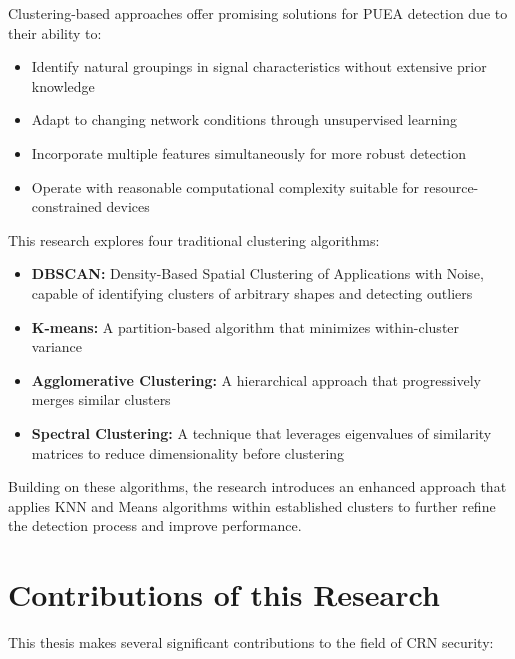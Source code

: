 Clustering-based approaches offer promising solutions for PUEA detection due to their ability to:

\begin{itemize}
    \item Identify natural groupings in signal characteristics without extensive prior knowledge
    \item Adapt to changing network conditions through unsupervised learning
    \item Incorporate multiple features simultaneously for more robust detection
    \item Operate with reasonable computational complexity suitable for resource-constrained devices
\end{itemize}

This research explores four traditional clustering algorithms:

\begin{itemize}
    \item \textbf{DBSCAN:} Density-Based Spatial Clustering of Applications with Noise, capable of identifying clusters of arbitrary shapes and detecting outliers
    \item \textbf{K-means:} A partition-based algorithm that minimizes within-cluster variance
    \item \textbf{Agglomerative Clustering:} A hierarchical approach that progressively merges similar clusters
    \item \textbf{Spectral Clustering:} A technique that leverages eigenvalues of similarity matrices to reduce dimensionality before clustering
\end{itemize}

Building on these algorithms, the research introduces an enhanced approach that applies KNN and Means algorithms within established clusters to further refine the detection process and improve performance.

\section{Contributions of this Research}

This thesis makes several significant contributions to the field of CRN security:

